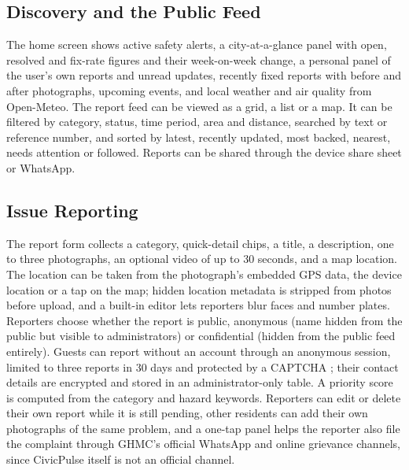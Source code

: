 \documentclass[conference]{IEEEtran}
\begin{document}
\subsection{Discovery and the Public Feed}
The home screen shows active safety alerts, a city-at-a-glance panel with open, resolved and fix-rate figures and their week-on-week change, a personal panel of the user's own reports and unread updates, recently fixed reports with before and after photographs, upcoming events, and local weather and air quality from Open-Meteo. The report feed can be viewed as a grid, a list or a map. It can be filtered by category, status, time period, area and distance, searched by text or reference number, and sorted by latest, recently updated, most backed, nearest, needs attention or followed. Reports can be shared through the device share sheet or WhatsApp.

\subsection{Issue Reporting}
The report form collects a category, quick-detail chips, a title, a description, one to three photographs, an optional video of up to 30 seconds, and a map location. The location can be taken from the photograph's embedded GPS data, the device location or a tap on the map; hidden location metadata is stripped from photos before upload, and a built-in editor lets reporters blur faces and number plates. Reporters choose whether the report is public, anonymous (name hidden from the public but visible to administrators) or confidential (hidden from the public feed entirely). Guests can report without an account through an anonymous session, limited to three reports in 30 days and protected by a CAPTCHA \cite{b13}; their contact details are encrypted and stored in an administrator-only table. A priority score is computed from the category and hazard keywords. Reporters can edit or delete their own report while it is still pending, other residents can add their own photographs of the same problem, and a one-tap panel helps the reporter also file the complaint through GHMC's official WhatsApp and online grievance channels, since CivicPulse itself is not an official channel.
\end{document}

